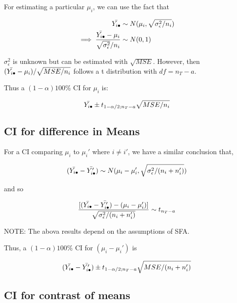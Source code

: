 \documentclass[10pt]{article}
\newcommand{\mean}[1]{\mu_{#1}}
\newcommand{\sigvar}[1]{\sigma^2_{#1}} %
\begin{document}
\begin{multicols}{3}
    For estimating a particular $\mean{i}$, we can use the fact that 

    \begin{align}
        \bar{Y_{i\bul}} & \sim N(\mean{i}, \sqrt{\sigvar{\epsilon}/n_i}) \\
        \implies \frac{\bar{Y_{i\bul}} - \mean{i}}{\sqrt{\sigvar{\epsilon}}/n_i} & \sim N(0,1)
    \end{align}

    $\sigvar{\epsilon}$ is unknown but can be estimated with $\sqrt{MSE}$. However, then $(\bar{Y_{i\bul}} - \mean{i})/\sqrt{MSE/n_i}$ follows a t distribution with $df = n_T - a$.

    Thus a $(1-\alpha) 100\%$ CI for $\mean{i}$ is:

    \begin{equation}
        \bar{Y_{i\bullet}} \pm t_{1 - \alpha/2; n_T - a} \sqrt{MSE/n_i}
    \end{equation}

    \subsection{CI for difference in Means}

    For a CI comparing $\mean{i}$ to $\mean{i}'$ where $i \ne i'$, we have a similar conclusion that,

    \begin{equation}
        (\bar{Y_{i\bul}} - \bar{Y_{i\bul}'}) \sim N(\mean{i} - \mean{i}', \sqrt{\sigvar{\epsilon}/(n_i + n_i')})
    \end{equation}

    and so 

    \begin{equation}
        \frac{[(\bar{Y_{i\bul}} - \bar{Y_{i\bul}'}) - (\mean{i} - \mean{i}')]}{\sqrt{\sigvar{\epsilon}/(n_i + n_i')}} \sim t_{n_T - a}
    \end{equation}

    NOTE: The abova results depend on the assumptions of SFA.

    Thus, a $(1-\alpha)100\%$ CI for $(\mean{i} - \mean{i}')$ is 

    \begin{equation}
        (\bar{Y_{i\bullet}} - \bar{Y_{i\bullet}'}) \pm t_{1-\alpha/2; n_T - a} \sqrt{MSE/(n_i + n_i')}
    \end{equation}

    \subsection{CI for contrast of means}


\end{multicols}
\end{document}
